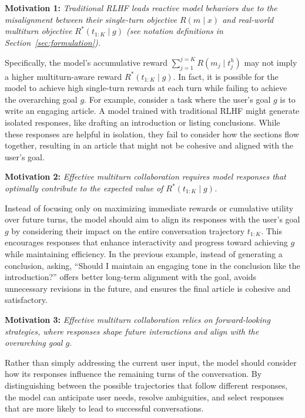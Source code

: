 \textbf{Motivation 1:}  
\textit{Traditional RLHF leads reactive model behaviors due to the misalignment between their single-turn objective $R(m \mid x)$ and real-world multiturn objective $R^*(t_{1:K} \mid g)$ (see notation definitions in Section~\ref{sec:formulation}).} 

Specifically, the model's accumulative reward $\sum_{j=1}^{j=K} R(m_j \mid t_j^h)$ may not imply a higher multiturn-aware reward $R^*(t_{1:K} \mid g)$. In fact, it is possible for the model to achieve high single-turn rewards at each turn while failing to achieve the overarching goal $g$. For example, consider a task where the user’s goal $g$ is to write an engaging article. A model trained with traditional RLHF might generate isolated responses, like drafting an introduction or listing conclusions. While these responses are helpful in isolation, they fail to consider how the sections flow together, resulting in an article that might not be cohesive and aligned with the user’s goal.

\textbf{Motivation 2:}  
\textit{Effective multiturn collaboration requires model responses that optimally contribute to the expected value of $R^*(t_{1:K} \mid g)$.}

Instead of focusing only on maximizing immediate rewards or cumulative utility over future turns, the model should aim to align its responses with the user’s goal $g$ by considering their impact on the entire conversation trajectory $t_{1:K}$. This encourages responses that enhance interactivity and progress toward achieving $g$ while maintaining efficiency. In the previous example, instead of generating a conclusion, asking, ``Should I maintain an engaging tone in the conclusion like the introduction?'' offers better long-term alignment with the goal, avoids unnecessary revisions in the future, and ensures the final article is cohesive and satisfactory.

\textbf{Motivation 3: }  
\textit{Effective multiturn collaboration relies on forward-looking strategies, where responses shape future interactions and align with the overarching goal $g$.}  

Rather than simply addressing the current user input, the model should consider how its responses influence the remaining turns of the conversation. By distinguishing between the possible trajectories that follow different responses, the model can anticipate user needs, resolve ambiguities, and select responses that are more likely to  lead to successful conversations.


